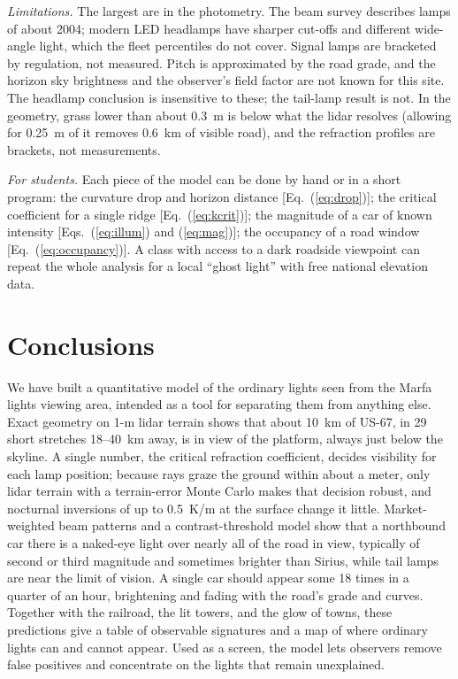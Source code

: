\documentclass[aip,jap,amsmath,amssymb,reprint,floatfix]{revtex4-2}
\begin{document}
\textit{Limitations.} The largest are in the photometry. The beam survey describes lamps of about 2004; modern LED headlamps have sharper cut-offs and different wide-angle light, which the fleet percentiles do not cover. Signal lamps are bracketed by regulation, not measured. Pitch is approximated by the road grade, and the horizon sky brightness and the observer's field factor are not known for this site. The headlamp conclusion is insensitive to these; the tail-lamp result is not. In the geometry, grass lower than about 0.3~m is below what the lidar resolves (allowing for 0.25~m of it removes 0.6~km of visible road), and the refraction profiles are brackets, not measurements.

\textit{For students.} Each piece of the model can be done by hand or in a short program: the curvature drop and horizon distance [Eq.~(\ref{eq:drop})]; the critical coefficient for a single ridge [Eq.~(\ref{eq:kcrit})]; the magnitude of a car of known intensity [Eqs.~(\ref{eq:illum}) and (\ref{eq:mag})]; the occupancy of a road window [Eq.~(\ref{eq:occupancy})]. A class with access to a dark roadside viewpoint can repeat the whole analysis for a local ``ghost light'' with free national elevation data.

\section{Conclusions}

We have built a quantitative model of the ordinary lights seen from the Marfa lights viewing area, intended as a tool for separating them from anything else. Exact geometry on 1-m lidar terrain shows that about 10~km of US-67, in 29 short stretches 18--40~km away, is in view of the platform, always just below the skyline. A single number, the critical refraction coefficient, decides visibility for each lamp position; because rays graze the ground within about a meter, only lidar terrain with a terrain-error Monte Carlo makes that decision robust, and nocturnal inversions of up to 0.5~K/m at the surface change it little. Market-weighted beam patterns and a contrast-threshold model show that a northbound car there is a naked-eye light over nearly all of the road in view, typically of second or third magnitude and sometimes brighter than Sirius, while tail lamps are near the limit of vision. A single car should appear some 18 times in a quarter of an hour, brightening and fading with the road's grade and curves. Together with the railroad, the lit towers, and the glow of towns, these predictions give a table of observable signatures and a map of where ordinary lights can and cannot appear. Used as a screen, the model lets observers remove false positives and concentrate on the lights that remain unexplained.
\end{document}
